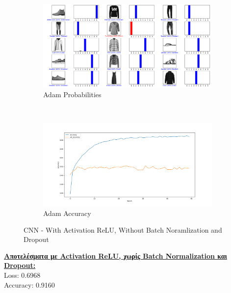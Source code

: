 \documentclass{article}
\begin{document}
	\begin{figure}[h!]
		\centering
		\begin{subfigure}[t]{0.5\textwidth}
			\centering
			\includegraphics[width=\linewidth]{../exercise3_3/images/fashion_cnn_without_batch_dropout_probabilities.png}
			\caption{Adam Probabilities}
		\end{subfigure}%
		~
		\begin{subfigure}[t]{0.5\textwidth}
			\centering
			\includegraphics[width=\linewidth]{../exercise3_3/images/fashion_cnn_without_batch_dropout_accuracy.png}
			\caption{Adam Accuracy}
		\end{subfigure}
		\caption{CNN - With Activation ReLU, Without Batch Noramlization and Dropout}
	\end{figure}
	
	\noindent
	\textbf{\underline{Aποτελέσματα με Activation ReLU, χωρίς Batch Normalization και Dropout:}}\\
	Loss: 0.6968 \\
	Accuracy: 0.9160
	
\end{document}
